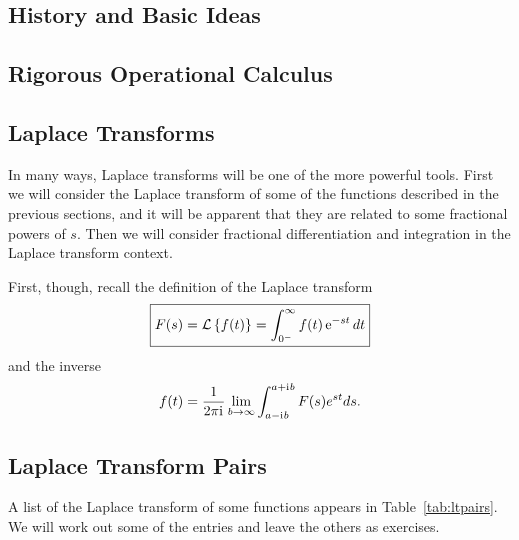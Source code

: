     \subsection{History and Basic Ideas}
    \subsection{Rigorous Operational Calculus}
    \subsection{Laplace Transforms}
    \label{sec:laplace}
    In many ways, Laplace transforms will be one of the more powerful tools. First we will consider the Laplace transform of some of the functions described in the previous sections, and it will be apparent that they are related to some fractional powers of $s$. Then we will consider fractional differentiation and integration in the Laplace transform context.

    First, though, recall the definition of the Laplace transform
    \begin{equation}
      \boxed{ F(s) = \mathcal L \left\{ f(t) \right\} = \int_{0^-}^\infty f(t) \operatorname{e}^{-s t} dt
      }
      \label{eq:laplacedef}
    \end{equation} 
    and the inverse
    \begin{equation}
      f(t) = \frac{1}{2 \pi \mathrm{i}\mkern1mu} \lim_{b \rightarrow \infty} \int_{a - \mathrm{i}\mkern1mu b}^{a + \mathrm{i}\mkern1mu b} F(s) e^{s t} ds.
      \label{eq:inverselaplace}
    \end{equation}

    \subsection{Laplace Transform Pairs}

    A list of the Laplace transform of some functions appears in Table~\ref{tab:ltpairs}. We will work out some of the entries and leave the others as exercises.

